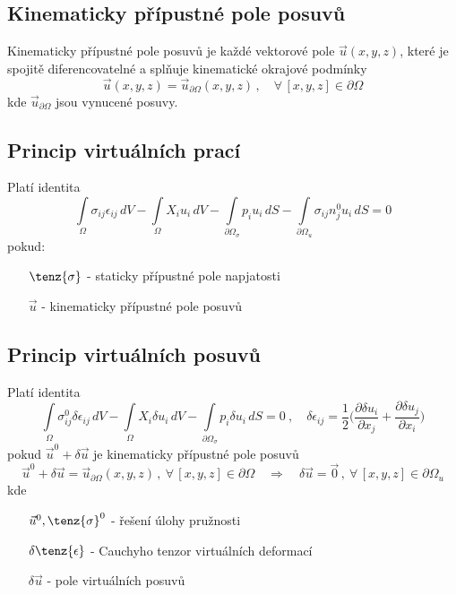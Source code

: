 \documentclass[10pt,oneside]{article}
\begin{document}
\subsection*{Kinematicky přípustné pole posuvů}
%
Kinematicky přípustné pole posuvů je každé vektorové pole $\vec{u}(x,y,z)$, které je spojitě diferencovatelné a splňuje kinematické okrajové podmínky
%
\begin{equation*}
\vec{u}(x,y,z) = \vec{u}_{\partial\Omega}(x,y,z) \,,\quad \forall\,[x,y,z] \in \partial\Omega
\end{equation*}
%
kde $\vec{u}_{\partial\Omega}$ jsou vynucené posuvy.

\newpage
\subsection*{Princip virtuálních prací}
%
Platí identita
%
\begin{equation*}
	\int\limits_\Omega \sigma_{ij} \epsilon_{ij} \,dV - \int\limits_\Omega X_i u_i \,dV - \int\limits_{\partial\Omega_\sigma} p_i u_i \,dS - \int\limits_{\partial\Omega_u} \sigma_{ij} n^0_j u_i \,dS = 0
\end{equation*}
%
pokud:
\begin{itemize}
\item[$\tenz{\sigma}$] - staticky přípustné pole napjatosti
\item[$\vec{u}$] - kinematicky přípustné pole posuvů
\end{itemize}


\subsection*{Princip virtuálních posuvů}
%
Platí identita
%
\begin{equation*}
	\int\limits_\Omega \sigma_{ij}^0 \delta\epsilon_{ij} \,dV - \int\limits_\Omega X_i \delta u_i \,dV - \int\limits_{\partial\Omega_\sigma} p_i \delta u_i \,dS = 0
	\ ,\quad
	\delta\epsilon_{ij} = \frac{1}{2} \bigg(\frac{\partial \delta u_i}{\partial x_j} + \frac{\partial \delta u_j}{\partial x_i} \bigg)
\end{equation*}
%
pokud $\vec{u}^0 + \delta\vec{u}$ je kinematicky přípustné pole posuvů
%
\begin{equation*}
	\vec{u}^0 + \delta\vec{u} = \vec{u}_{\partial\Omega}(x,y,z) \,,\ \forall\,[x,y,z] \in \partial\Omega
	\quad \Rightarrow \quad
	\delta\vec{u} = \vec{0} \,,\ \forall\,[x,y,z] \in \partial\Omega_u
\end{equation*}
%
kde
%
\begin{itemize}[leftmargin=15mm]
	\item[$\vec{u}^0,\tenz{\sigma}^0$] - řešení úlohy pružnosti
	\item[$\delta\tenz{\epsilon}$] - Cauchyho tenzor virtuálních deformací
	\item[$\delta\vec{u}$] - pole virtuálních posuvů %
\end{itemize}
\end{document}
